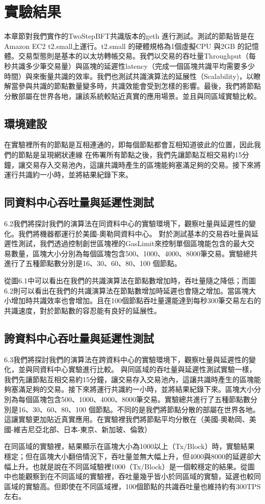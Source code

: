 \chapter{實驗結果} \label{se_6}
本章節對我們實作的TwoStepBFT共識版本的geth 進行測試。測試的節點皆是在Amazon EC2 t2.small上運行。t2.small 的硬體規格為1個虛擬CPU 與2GB 的記憶體。交易型態則是基本的以太坊轉帳交易。我們以交易的吞吐量Throughput（每秒共識多少筆交易量）與區塊的延遲性latency（完成一個區塊共識平均需要多少時間）與來衡量共識的效率。我們也測試共識演算法的延展性（Scalability)，以瞭解當參與共識的節點數量變多時，共識效能會受到怎樣的影響。最後，我們將節點分散部屬在世界各地，讓該系統較貼近真實的應用場景。並且與同區域實驗比較。
\section{環境建設}\label{se_6}
在實驗裡所有的節點是互相連通的，即每個節點都會互相知道彼此的位置，因此我們的節點是呈現網狀連線
在佈署所有節點之後，我們先讓節點互相交易約15分鐘，讓交易存入交易池內，這讓共識時產生的區塊能夠塞滿足夠的交易。接下來將運行共識約一小時，並將結果紀錄下來。
\section{同資料中心吞吐量與延遲性測試}\label{se_6}
6.2我們將探討我們的演算法在同資料中心的實驗環境下，觀察吐量與延遲性的變化。我們將機器都運行於美國-奧勒岡資料中心。
對於測試基本的交易吞吐量與延遲性測試，我們透過控制創世區塊裡的GasLimit來控制單個區塊能包含的最大交易數量，區塊大小分別為每個區塊包含500、1000、4000、8000筆交易。實驗總共進行了五種節點數分別是16、30、60、80、100 個節點。
 
\newpage


從圖6.1中可以看出在我們的共識演算法在節點數增加時，吞吐量隨之降低；而圖6.2則可以看出在我們的共識演算法在節點數增加時延遲也會隨之增加。當區塊大小增加時共識效率也會增加。且在100個節點吞吐量還能達到每秒300筆交易左右的共識速度，對於節點數的容忍能有良好的延展性。



\section{誇資料中心吞吐量與延遲性測試}\label{se_6}
6.3我們將探討我們的演算法在跨資料中心的實驗環境下，觀察吐量與延遲性的變化，並與同資料中心實驗進行比較。
與同區域的吞吐量與延遲性測試實驗一樣，我們先讓節點互相交易約15分鐘，讓交易存入交易池內，這讓共識時產生的區塊能夠塞滿足夠的交易。接下來將運行共識約一小時，並將結果紀錄下來。區塊大小分別為每個區塊包含500、1000、4000、8000筆交易。實驗總共進行了五種節點數分別是16、30、60、80、100 個節點。不同的是我們將節點分散的部屬在世界各地。這讓實驗更加貼近真實應用。在實驗裡我們將節點平均分散在（美國-奧勒岡、美國-維吉尼亞北部、日本-東京、新加玻、倫敦）



在同區域的實驗裡，結果顯示在區塊大小為1000以上（Tx/Block）時，實驗結果穩定；但在區塊大小翻倍情況下，吞吐量並無大幅上升，但4000與8000的延遲卻大幅上升。也就是說在不同區域驗裡1000（Tx/Block）是一個較穩定的結果。從圖中也能觀察到在不同區域的實驗裡，吞吐量幾乎皆小於同區域的實驗，延遲也較同區域的實驗高。但即使在不同區域裡，100個節點的共識吞吐量也維持約有300TPS左右。




